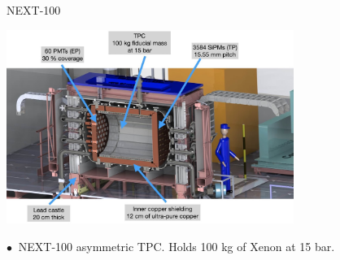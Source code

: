 \documentclass [aspectratio=169]{beamer}
\begin{document}
\begin{frame}{NEXT-100}

\includegraphics[width=0.70\textwidth]{NEXT-100-description.jpg}


$\bullet~$ NEXT-100  asymmetric TPC. Holds 100 kg of Xenon at 15 bar.  
\end{frame}
\end{document}

